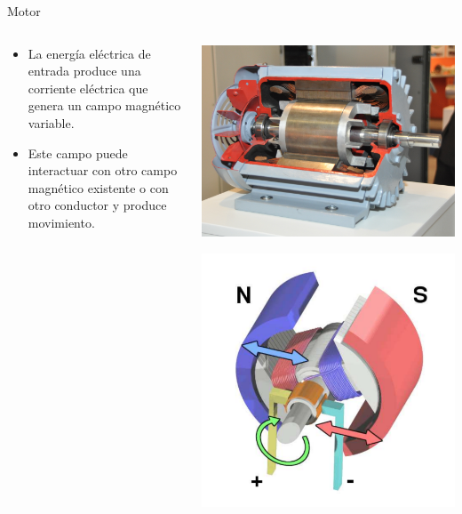 \documentclass[xcolor={usenames,svgnames,dvipsnames}]{beamer}
\begin{document}
\begin{frame}[label={sec:org0952f10}]{Motor}
\begin{columns}
\begin{column}{0.6\columnwidth}
\begin{itemize}
\item La energía eléctrica de entrada produce una corriente eléctrica que genera un campo magnético variable.
\item Este campo puede interactuar con otro campo magnético existente o con otro conductor y produce movimiento.
\end{itemize}
\end{column}

\begin{column}{0.5\columnwidth}
\begin{center}
\includegraphics[width=.9\linewidth]{../figs/Seccion_Motor.jpeg}
\end{center}
\begin{center}
\includegraphics[width=.9\linewidth]{../figs/Electric_motor_cycle_3.pdf}
\end{center}
\end{column}
\end{columns}
\end{frame}
\end{document}
